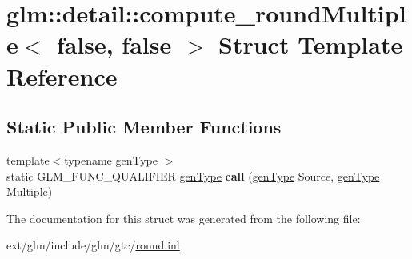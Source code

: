 \hypertarget{structglm_1_1detail_1_1compute__round_multiple_3_01false_00_01false_01_4}{\section{glm\-:\-:detail\-:\-:compute\-\_\-round\-Multiple$<$ false, false $>$ Struct Template Reference}
\label{structglm_1_1detail_1_1compute__round_multiple_3_01false_00_01false_01_4}
}
\subsection*{Static Public Member Functions}
\begin{DoxyCompactItemize}
\item 
\hypertarget{structglm_1_1detail_1_1compute__round_multiple_3_01false_00_01false_01_4_a9242ffccd610779b8020ad382d47213a}{{\footnotesize template$<$typename gen\-Type $>$ }\\static G\-L\-M\-\_\-\-F\-U\-N\-C\-\_\-\-Q\-U\-A\-L\-I\-F\-I\-E\-R \hyperlink{structglm_1_1detail_1_1gen_type}{gen\-Type} {\bfseries call} (\hyperlink{structglm_1_1detail_1_1gen_type}{gen\-Type} Source, \hyperlink{structglm_1_1detail_1_1gen_type}{gen\-Type} Multiple)}\label{structglm_1_1detail_1_1compute__round_multiple_3_01false_00_01false_01_4_a9242ffccd610779b8020ad382d47213a}

\end{DoxyCompactItemize}


The documentation for this struct was generated from the following file\-:\begin{DoxyCompactItemize}
\item 
ext/glm/include/glm/gtc/\hyperlink{round_8inl}{round.\-inl}\end{DoxyCompactItemize}
